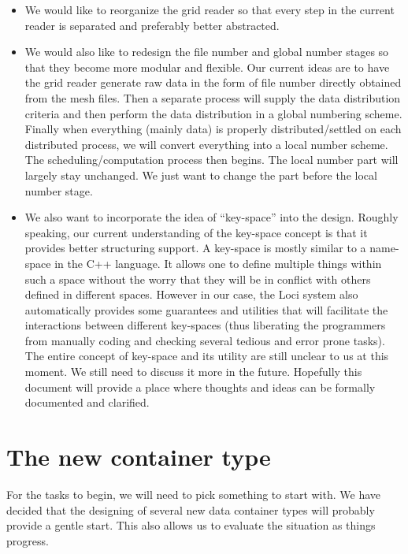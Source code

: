 \documentclass{article}
\begin{document}
\begin{itemize}
  \item We would like to reorganize the grid reader so that every step
    in the current reader is separated and preferably better abstracted.
  \item We would also like to redesign the file number and global number
    stages so that they become more modular and flexible.  Our current
    ideas are to have the grid reader generate raw data in the form of
    file number directly obtained from the mesh files.  Then a separate
    process will supply the data distribution criteria and then perform
    the data distribution in a global numbering scheme.  Finally when
    everything (mainly data) is properly distributed/settled on each
    distributed process, we will convert everything into a local number
    scheme.  The scheduling/computation process then begins.  The local
    number part will largely stay unchanged.  We just want to change the
    part before the local number stage.
  \item We also want to incorporate the idea of ``key-space'' into
    the design.  Roughly speaking, our current understanding of the
    key-space concept is that it provides better structuring support.  A
    key-space is mostly similar to a name-space in the C++ language.  It
    allows one to define multiple things within such a space without the
    worry that they will be in conflict with others defined in different
    spaces.  However in our case, the Loci system also automatically
    provides some guarantees and utilities that will facilitate the
    interactions between different key-spaces (thus liberating the
    programmers from manually coding and checking several tedious and
    error prone tasks). The entire concept of key-space and its utility
    are still unclear to us at this moment.  We still need to discuss it
    more in the future.  Hopefully this document will provide a place
    where thoughts and ideas can be formally documented and clarified.
\end{itemize}

\section{The new container type}
For the tasks to begin, we will need to pick something to start with.
We have decided that the designing of several new data container types
will probably provide a gentle start.  This also allows us to evaluate
the situation as things progress.
\end{document}
